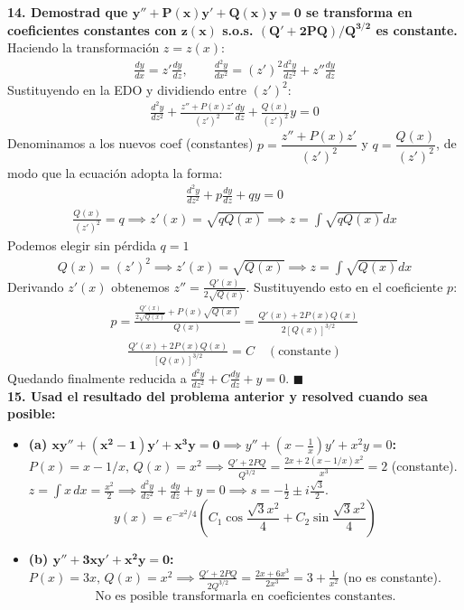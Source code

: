 \documentclass[11pt, a4paper]{article}
\begin{document}
\noindent\textbf{14. Demostrad que $\bm{y''+P(x)y'+Q(x)y=0}$ se transforma en coeficientes constantes con $\bm{z(x)}$ s.o.s. $\bm{(Q'+2PQ)/Q^{3/2}}$ es constante.} \\
Haciendo la transformación $z = z(x)$:
\begin{align*}
\frac{dy}{dx} = z' \frac{dy}{dz}, \qquad \frac{d^2y}{dx^2} = (z')^2 \frac{d^2y}{dz^2} + z'' \frac{dy}{dz}
\end{align*}
Sustituyendo en la EDO y dividiendo entre $(z')^2$:
\begin{align*}
\frac{d^2y}{dz^2} + \frac{z'' + P(x)z'}{(z')^2} \frac{dy}{dz} + \frac{Q(x)}{(z')^2} y = 0
\end{align*}
Denominamos a los nuevos coef (constantes) $p = \dfrac{z'' + P(x)z'}{(z')^2}$ y $q = \dfrac{Q(x)}{(z')^2}$, de modo que la ecuación adopta la forma:
\begin{align*}
\frac{d^2y}{dz^2} + p\frac{dy}{dz} + qy = 0
\end{align*}
\begin{align*}
\frac{Q(x)}{(z')^2} = q \implies z'(x) = \sqrt{q Q(x)} \implies z = \int \sqrt{qQ(x)} dx
\end{align*}
Podemos elegir sin pérdida $q= 1$
\begin{align*}
Q(x) = (z')^2 \implies z'(x) = \sqrt{Q(x)} \implies z = \int \sqrt{Q(x)} dx
\end{align*}
Derivando $z'(x)$ obtenemos $z'' = \frac{Q'(x)}{2\sqrt{Q(x)}}$. Sustituyendo esto en el coeficiente $p$:
\begin{align*}
p = \frac{\frac{Q'(x)}{2\sqrt{Q(x)}} + P(x)\sqrt{Q(x)}}{Q(x)} = \frac{Q'(x) + 2P(x)Q(x)}{2[Q(x)]^{3/2}}
\end{align*}
\begin{align*}
\frac{Q'(x) + 2P(x)Q(x)}{[Q(x)]^{3/2}} = C \quad (\text{constante})
\end{align*}
Quedando finalmente reducida a $\frac{d^2y}{dz^2} + C \frac{dy}{dz} + y = 0$. \qquad $\blacksquare$ \\

\noindent\textbf{15. Usad el resultado del problema anterior y resolved cuando sea posible:}

\begin{itemize}
\item \textbf{(a) $\bm{xy''+(x^2-1)y'+x^3y=0} \implies y'' + \left(x - \frac{1}{x}\right)y' + x^2 y = 0$:} \\
$P(x) = x - 1/x, \, Q(x) = x^2 \implies \frac{Q'+2PQ}{Q^{3/2}} = \frac{2x + 2(x-1/x)x^2}{x^3} = 2$ (constante). \\
$z = \int x \, dx = \frac{x^2}{2} \implies \frac{d^2y}{dz^2} + \frac{dy}{dz} + y = 0 \implies s = -\frac{1}{2} \pm i\frac{\sqrt{3}}{2}$.
\[
\boxed{y(x) = e^{-x^2/4}\left(C_1 \cos\frac{\sqrt{3}x^2}{4} + C_2 \sin\frac{\sqrt{3}x^2}{4}\right)}
\]

\item \textbf{(b) $\bm{y''+3xy'+x^2y=0}$:} \\
$P(x) = 3x, \, Q(x) = x^2 \implies \frac{Q'+2PQ}{2Q^{3/2}} = \frac{2x + 6x^3}{2x^3} = 3 + \frac{1}{x^2}$ (no es constante).
\[
\boxed{\text{No es posible transformarla en coeficientes constantes.}}
\]
\end{itemize}
\end{document}
